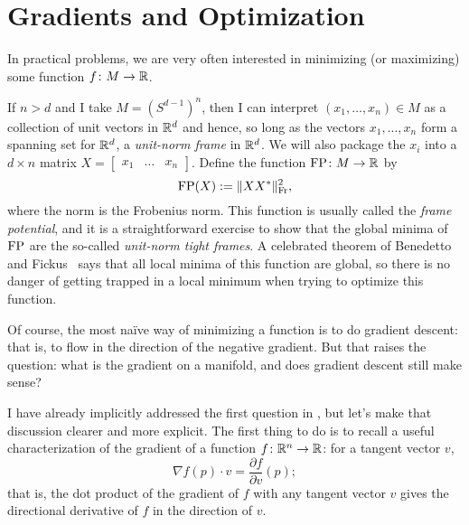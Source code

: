 
\section{Gradients and Optimization}
\label{sec:gradients}

In practical problems, we are very often interested in minimizing (or maximizing) some function $f \colon\thinspace\! M \to \mathbb{R}$. 

\begin{example}\label{ex:frame potential}
If $n > d$ and I take $M = (S^{d-1})^n$, then I can interpret $(x_1, \dots , x_n) \in M$ as a collection of unit vectors in $\mathbb{R}^d$ and hence, so long as the vectors $x_1, \dots , x_n$ form a spanning set for $\mathbb{R}^d$, a \emph{unit-norm frame} in $\mathbb{R}^d$. We will also package the $x_i$ into a $d \times n$ matrix $X = \begin{bmatrix} x_1 & \dots & x_n\end{bmatrix}$. Define the function $\operatorname{FP} \colon\thinspace\! M \to \mathbb{R}$ by
\[
	\operatorname{FP}(X) := \|XX^\ast\|_{\text{Fr}}^2,
\]
where the norm is the Frobenius norm. This function is usually called the \emph{frame potential}, and it is a straightforward exercise to show that the global minima of $\operatorname{FP}$ are the so-called \emph{unit-norm tight frames}. A celebrated theorem of Benedetto and Fickus~\cite{benedettoFiniteNormalizedTight2003} says that all local minima of this function are global, so there is no danger of getting trapped in a local minimum when trying to optimize this function.
\end{example}


Of course, the most naïve way of minimizing a function is to do gradient descent: that is, to flow in the direction of the negative gradient. But that raises the question: what is the gradient on a manifold, and does gradient descent still make sense?

I have already implicitly addressed the first question in , but let's make that discussion clearer and more explicit. The first thing to do is to recall a useful characterization of the gradient of a function $f \colon\thinspace\! \mathbb{R}^n \to \mathbb{R}$: for a tangent vector $v$, 
\begin{equation}\label{eq:euclidean gradient}
	\nabla f(p) \cdot v = \frac{\partial f}{\partial v}(p);
\end{equation}
that is, the dot product of the gradient of $f$ with any tangent vector $v$ gives the directional derivative of $f$ in the direction of $v$.

